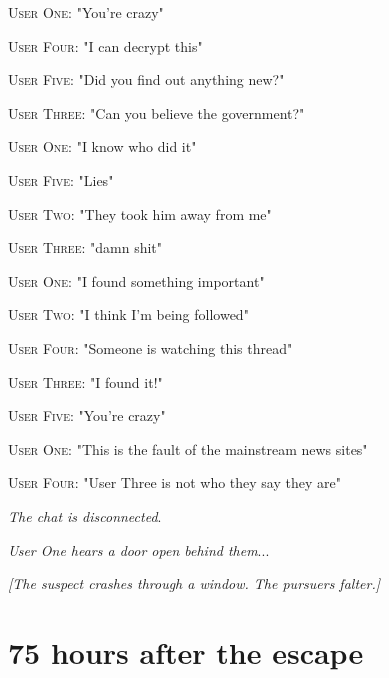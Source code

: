 \documentclass{report}
\begin{document}
\textsc{User One}: "You're crazy" 

\textsc{User Four}: "I can decrypt this" 

\textsc{User Five}: "Did you find out anything new?" 

\textsc{User Three}: "Can you believe the government?" 

\textsc{User One}: "I know who did it" 

\textsc{User Five}: "Lies" 

\textsc{User Two}: "They took him away from me" 

\textsc{User Three}: "damn shit" 

\textsc{User One}: "I found something important" 

\textsc{User Two}: "I think I'm being followed" 

\textsc{User Four}: "Someone is watching this thread" 

\textsc{User Three}: "I found it!" 

\textsc{User Five}: "You're crazy" 

\textsc{User One}: "This is the fault of the mainstream news sites" 

\textsc{User Four}: "User Three is not who they say they are" 

\textit{The chat is disconnected}. 

\textit{User One hears a door open behind them}...

\textit{[The suspect crashes through a window. The pursuers falter.]}


\section*{75 \small{hours after the escape}}
\end{document}
